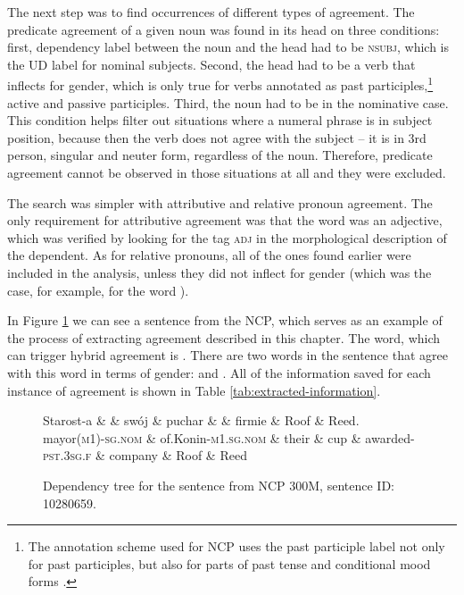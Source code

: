 The next step was to find occurrences of different types of agreement. The predicate agreement of a given noun was found in its head on three conditions: first, dependency label between the noun and the head had to be \textsc{nsubj}, which is the UD label for nominal subjects. Second, the head had to be a verb that inflects for gender, which is only true for verbs annotated as past participles,\footnote{The annotation scheme used for NCP uses the past participle label not only for past participles, but also for parts of past tense and conditional mood forms \citep{przepiorkowski_narodowy_2012}.} active and passive participles. Third, the noun had to be in the nominative case. This condition helps filter out situations where a numeral phrase is in subject position, because then the verb does not agree with the subject -- it is in 3rd person, singular and neuter form, regardless of the noun. Therefore, predicate agreement cannot be observed in those situations at all and they were excluded.

The search was simpler with attributive and relative pronoun agreement. The only requirement for attributive agreement was that the word was an adjective, which was verified by looking for the tag \textsc{adj} in the morphological description of the dependent. As for relative pronouns, all of the ones found earlier were included in the analysis, unless they did not inflect for gender (which was the case, for example, for the word ).

In Figure \ref{tree} we can see a sentence from the NCP, which serves as an example of the process of extracting agreement described in this chapter. The word, which can trigger hybrid agreement is . There are two words in the sentence that agree with this word in terms of gender:  and . All of the information saved for each instance of agreement is shown in Table \ref{tab:extracted-information}.

\begin{figure}[h]
  \centering
  \begin{dependency}
    \begin{deptext}
      Starost-a \&  \& swój \& puchar \&  \& firmie \& Roof \& Reed.\\
      mayor\textsc{(m1)-sg.nom} \& of.Konin\textsc{-m1.sg.nom} \& their \& cup \& awarded\textsc{-pst.3sg.f} \& company \& Roof \& Reed\\
    \end{deptext}
  \end{dependency}
  \caption*{``The mayor of Konin awarded their cup to the company Roof Reed.''}
  \caption{Dependency tree for the sentence from NCP 300M, sentence ID: 10280659.}
  \label{tree}
\end{figure}

